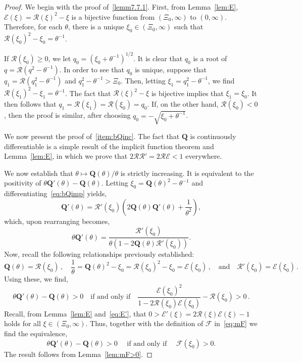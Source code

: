 \documentclass[AHL,Unicode,longabstracts]{cedram}
\newcommand{\bQ}{\mathbf{Q}}
\newcommand{\mE}{\mathcal{E}}
\newcommand{\mF}{\mathcal{F}}
\newcommand{\mR}{\mathcal{R}}
\newcommand{\1}{\mathds{1}}
\begin{document}
\begin{proof}
We begin with the proof of~\eqref{lemm7.7.1}. First, from Lemma~\ref{lem:E}, $\mE(\xi) = \mR(\xi)^2 - \xi$ is a bijective function from $(\Xi_0,\infty)$ to $(0,\infty)$. Therefore, for each $\theta$, there is a unique $\xi_0 \in (\Xi_0, \infty)$ such that $\mR(\xi_0)^2 - \xi_0 = \theta^{-1}$.

If $\mR(\xi_0) \geq 0$, we let $q_0 = \left (\xi_0 + \theta^{-1}\right) ^{1/2}$. It is clear that $q_0$ is a root of $q = \mR\left (q^2 - \theta^{-1}\right)$. In order to see that $q_0$ is unique, suppose that $q_1 = \mR(q_1^2 - \theta^{-1})$ and $q_1^2 - \theta^{-1}> \Xi_0$. Then, letting $\xi_1 = q_1^2 - \theta^{-1}$, we find $\mR(\xi_1)^2 - \xi_1 = \theta^{-1}$. The fact that $\mR(\xi)^2 - \xi$ is bijective implies that $\xi_1 = \xi_0$. It then follows that $q_1 = \mR(\xi_1) = \mR(\xi_0) = q_0$. If, on the other hand, $\mR(\xi_0) < 0$, then the proof is similar, after choosing $q_0 = - \sqrt{\xi_0 + \theta^{-1}}$.



We now present the proof of~\eqref{item:bQinc}. The fact that $\bQ$ is continuously differentiable is a simple result of the implicit function theorem and Lemma~\ref{lem:E}, in which we prove that $2\mR \mR' = 2\mR \mE < 1$ everywhere.

We now establish that $\theta \mapsto \bQ(\theta)/\theta$ is strictly increasing. It is equivalent to the positivity of $\theta\bQ'(\theta) - \bQ(\theta)$. Letting $\xi_0 = \bQ(\theta)^2 - \theta^{-1}$ and differentiating~\eqref{eq:bQimp} yields,
\begin{equation*}
\bQ'(\theta) = \mR'(\xi_0)\left (2 \bQ(\theta) \bQ'(\theta) + \dfrac{1}{\theta^2} \right),
\end{equation*}
which, upon rearranging becomes,
\begin{equation*}
\theta \bQ'(\theta) = \dfrac{\mR'(\xi_0)}{\theta\left (1 - 2\bQ(\theta)\mR'(\xi_0)\right)}.
\end{equation*}
Now, recall the following relationships previously established:
\begin{equation*}
\bQ(\theta) = \mR(\xi_0)\,,\quad \dfrac{1}{\theta} = \bQ(\theta)^2 - \xi_0 = \mR(\xi_0)^2 - \xi_0 = \mE(\xi_0)\,, \quad \text{and}\quad \mR'(\xi_0) = \mE(\xi_0)\,.
\end{equation*}
Using these, we find,
\begin{equation*}
\theta\bQ'(\theta) - \bQ(\theta) > 0
\quad \text{if and only if} \quad
\dfrac{\mE(\xi_0)^2}{1 - 2 \mR(\xi_0) \mE(\xi_0)} - \mR(\xi_0)> 0\,.
\end{equation*}
Recall, from Lemma~\ref{lem:E} and~\eqref{eq:E'}, that $0 > \mE'(\xi) = 2 \mR(\xi) \mE(\xi) - 1 $ holds for all $\xi\in(\Xi_0,\infty)$. Thus, together with the definition of $\mF$ in~\eqref{eq:mF} we find the equivalence,
\begin{equation*}
\theta\bQ'(\theta) - \bQ(\theta) > 0
\quad \text{ if and only if } \quad
\mF(\xi_0) > 0.
\end{equation*}
The result follows from Lemma~\ref{lem:mF>0}.




\end{proof}
\end{document}
